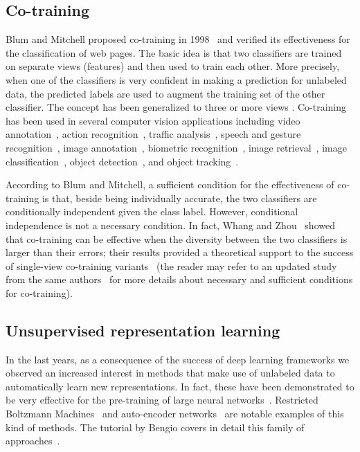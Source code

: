 \documentclass[journal,11pt]{IEEEtran}
\begin{document}
\subsection{Co-training}
Blum and Mitchell proposed co-training in
1998~\cite{blum1998combining} and verified its effectiveness for the
classification of web pages.  The basic idea is that two classifiers
are trained on separate views (features) and then used to train each
other.  More precisely, when one of the classifiers is very confident
in making a prediction for unlabeled data, the predicted labels are
used to augment the training set of the other classifier.
The concept has been generalized to three \cite{zhou2005tritraining} or more views \cite{li2007improve,zhou2011semi}.
Co-training has been used in several computer vision applications including video
annotation~\cite{wang2006enhanced}, action
recognition~\cite{gupta2008watch}, traffic
analysis~\cite{levin2003unsupervised}, speech and gesture
recognition~\cite{christoudias2006coadaptation}, image
annotation~\cite{feng2003bootstrapping}, biometric
recognition~\cite{bhatt2011cotraining}, image
retrieval~\cite{tong2001support}, image
classification~\cite{guillaumin2010multimodal},
object detection~\cite{levin2003unsupervised,javed2005online}, and object tracking~\cite{tang2007co}.

According to Blum and Mitchell, a sufficient condition for the
effectiveness of co-training is that, beside being individually
accurate, the two classifiers are conditionally independent given the
class label.  However, conditional independence is not a necessary
condition.  In fact, Whang and Zhou~\cite{wang2007analyzing} showed
that co-training can be effective when the diversity between the two
classifiers is larger than their errors; their results provided a
theoretical support to the success of single-view co-training
variants~\cite{goldman2000enhancing,chen2011automatic,wang2013co} (the reader
may refer to an updated study from the same authors~\cite{wang2010new}
for more details about necessary and sufficient conditions for
co-training).

\subsection{Unsupervised representation learning}
In the last years,
as a consequence of the success of deep learning frameworks we
observed an increased interest in methods that make use of unlabeled
data to automatically learn new representations.  In fact, these have
been demonstrated to be very effective for the pre-training of large
neural networks~\cite{hinton2006fast,jarrett2009best}.  Restricted
Boltzmann Machines~\cite{hinton2002training} and auto-encoder
networks~\cite{bourlard1988autoassociation} are notable examples of
this kind of methods.  The tutorial by Bengio covers in detail this
family of approaches~\cite{bengio2009learning}.
\end{document}
